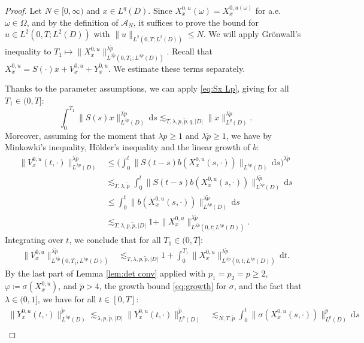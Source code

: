 \documentclass{amsart}
\theoremstyle{plain}
\theoremstyle{remark}
\theoremstyle{plain}
\numberwithin{equation}{section}
\newcommand{\ceqq}{\coloneqq}
\newcommand{\Om}{\Omega}
\newcommand{\om}{\omega}
\newcommand{\A}{{\mathcal A}}
\newcommand{\dd}{\,\mathrm{d}}
\begin{document}
\begin{proof}
Let $N\in[0,\infty)$ and $x\in L^q(D)$. 
Since $X_x^{0,u}(\om)=X_x^{0,u(\om)}$ for a.e.\ $\om\in\Om$, and by the definition of $\A_N$, it suffices to prove the bound for $u\in L^2(0,T;L^2(D))$ with $\|u\|_{L^2(0,T;L^2(D))}\leq N$. 
We will apply Gr\"onwall's inequality to $T_1\mapsto \|X_x^{0,u}\|_{L^{\lambda\tilde p}(0,T_1;L^{\lambda p}(D))}^{\lambda\tilde p}$. Recall that $X_x^{0,u}=S(\cdot)x+V_x^{0,u}+Y_x^{0,u}$. We estimate these terms separately.  

Thanks to the parameter assumptions, we can apply \eqref{eq:Sx Lp}, giving for all $T_1\in(0,T]$:
\[
\int_0^{T_1}\|S(s)x\|_{L^{\lambda p}(D)}^{\lambda \tilde p}\dd s 
 \lesssim_{T,\lambda,p,\tilde p,q,|D|} \|x\|_{L^q(D)}^{\lambda\tilde p}.
\]  
Moreover, assuming for the moment that $\lambda p\geq 1$ and $\lambda\tilde p\geq 1$, we have by Minkowki's inequality,  H\"older's inequality and the linear growth of $b$:
\begin{align*}
\|V_x^{0,u}(t,\cdot)\|_{L^{\lambda p}(D)}^{\lambda\tilde p}
&\leq \Big(\int_0^t\|S(t-s)b(X_x^{0,u}(s,\cdot))\|_{L^{\lambda p}(D)}\dd s\Big)^{\lambda\tilde p}\\
&\lesssim_{T,\lambda,\tilde p} \int_0^t\|S(t-s)b(X_x^{0,u}(s,\cdot))\|_{L^{\lambda p}(D)}^{\lambda\tilde p}\dd s \\
&\leq \int_0^t\|b(X_x^{0,u}(s,\cdot))\|_{L^{\lambda p}(D)}^{\lambda\tilde p}\dd s\\
&\lesssim_{T,\lambda,p,\tilde p,|D|} 1+ \|X_x^{0,u}\|_{L^{\lambda\tilde p}(0,t;L^{\lambda p}(D))}^{\lambda\tilde p}.
\end{align*}
Integrating over $t$, we conclude that for all $T_1\in(0,T]$:
\begin{align*}
\|V_x^{0,u}\|_{L^{\lambda\tilde p}(0,T_1;L^{\lambda p}(D))}^{\lambda\tilde p}
&\lesssim_{T,\lambda,p,\tilde p,|D|} 1+
\int_0^{T_1}\|X_x^{0,u}\|_{L^{\lambda\tilde p}(0,t;L^{\lambda p}(D))}^{\lambda\tilde p} \dd t.
\end{align*} 
By the last part of Lemma \ref{lem:det conv} applied with $p_1=p_2= p\geq 2$, $\varphi\ceqq \sigma(X_x^{0,u})$, and $\tilde p>4$, the growth bound \eqref{eq:growth} for $\sigma$, and the fact that $\lambda \in (0,1]$, we have for all $t\in[0,T]$:
\begin{align*}
\|Y_x^{0,u}(t,\cdot)\|_{L^{\lambda p}(D)}^{\tilde p} \lesssim_{\lambda,p,\tilde p,|D|}
  \|Y_x^{0,u}(t,\cdot)\|_{L^{p}(D)}^{\tilde p} 
  &\lesssim_{N,T,\tilde p} \int_0^t \|\sigma(X_x^{0,u}(s,\cdot))\|_{L^{p}(D)}^{\tilde p}\dd s\\

\end{align*}
\end{proof}
\end{document}
